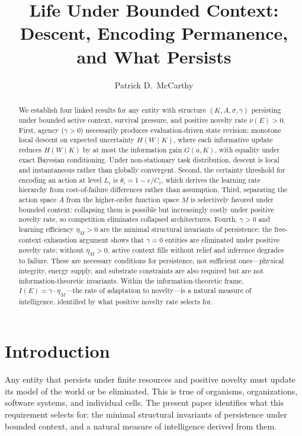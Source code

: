 \documentclass[11pt]{article}
\title{Life Under Bounded Context: Descent, Encoding Permanence,\\and What Persists}
\author{Patrick D.\ McCarthy}
\date{}
\theoremstyle{definition}
\theoremstyle{remark}
\begin{document}
\maketitle

\begin{abstract}
We establish four linked results for any entity with structure
$(K, A, \sigma, \gamma)$ persisting under bounded active context,
survival pressure, and positive novelty rate $\nu(E) > 0$.
First, agency ($\gamma > 0$) necessarily produces evaluation-driven
state revision: monotone local descent on expected uncertainty
$H(W \mid K)$, where each informative update reduces $H(W \mid K)$
by at most the information gain $G(a, K)$, with equality under exact
Bayesian conditioning. Under non-stationary task distribution,
descent is local and instantaneous rather than globally convergent.
Second, the certainty threshold for encoding an action at level $L_i$
is $\theta_i = 1 - \varepsilon / C_i$, which derives the learning
rate hierarchy from cost-of-failure differences rather than
assumption.
Third, separating the action space $A$ from the higher-order function
space $M$ is selectively favored under bounded context: collapsing them
is possible but increasingly costly under positive novelty rate, so
competition eliminates collapsed architectures.
Fourth, $\gamma > 0$ and learning efficiency $\eta_M > 0$ are the
minimal structural invariants of persistence: the free-context
exhaustion argument shows that $\gamma = 0$ entities are eliminated
under positive novelty rate; without $\eta_M > 0$, active context
fills without relief and inference degrades to failure. These are
necessary conditions for persistence, not sufficient ones---physical
integrity, energy supply, and substrate constraints are also required
but are not information-theoretic invariants. Within the
information-theoretic frame,
$I(E) = \gamma \cdot \eta_M$---the rate of adaptation to novelty---is
a natural measure of intelligence, identified by what positive novelty
rate selects for.
\end{abstract}

\section{Introduction}
\label{sec:intro}

Any entity that persists under finite resources and positive novelty
must update its model of the world or be eliminated. This is true of
organisms, organizations, software systems, and individual cells.
The present paper identifies what this requirement selects for:
the minimal structural invariants of persistence under bounded context,
and a natural measure of intelligence derived from them.
\end{document}
